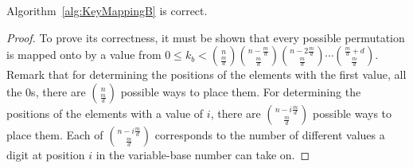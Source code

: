\begin{theorem}
Algorithm~\ref{alg:KeyMappingB} is correct.
\end{theorem}
\begin{proof}
To prove its correctness, it must be shown that every possible permutation is mapped onto by a value from $0 \leq k_b < {n \choose \frac{m}{d}}{n - \frac{m}{d} \choose \frac{m}{d}}{n - 2\frac{m}{d} \choose \frac{m}{d}}\cdots{\frac{m}{d} + d \choose \frac{m}{d}}$. Remark that for determining the positions of the elements with the first value, all the $0$s, there are ${n \choose \frac{m}{d}}$ possible ways to place them. For determining the positions of the elements with a value of $i$, there are ${n - i\frac{m}{d} \choose \frac{m}{d}}$ possible ways to place them. Each of ${n - i\frac{m}{d} \choose \frac{m}{d}}$ corresponds to the number of different values a digit at position $i$ in the variable-base number can take on.


\end{proof}
